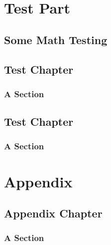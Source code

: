 \documentclass[11pt,paper=a5,footinclude=true,headinclude=true]{scrbook} %
\begin{document}
    
    \tableofcontents 


    \cleardoublepage\part{Test Part}
    \chapter{Some Math Testing}
    \lipsum[1]
        
    \chapter{Test Chapter}
    \lipsum[1]

    \section{A Section}
    \lipsum[1]
    
    \chapter{Test Chapter}
    \lipsum[1]
    
    \section{A Section}
    \lipsum[1]

%   

    \appendix
    \cleardoublepage\part{Appendix}
    \chapter{Appendix Chapter}
    \lipsum[1]
    
    \section{A Section}
    \lipsum[1]
\end{document}
